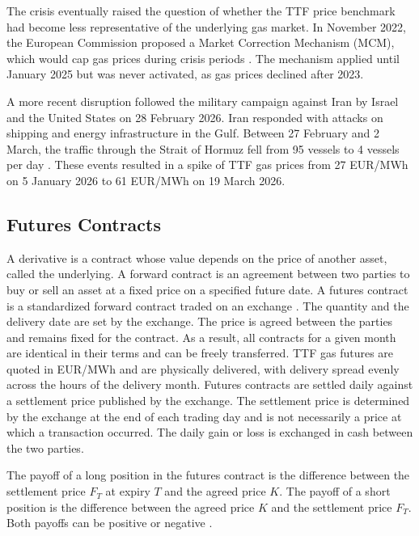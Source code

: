 The crisis eventually raised the question of whether the TTF price benchmark had become less representative of the underlying gas market. In November 2022, the European Commission proposed a Market Correction Mechanism (MCM), which would cap gas prices during crisis periods \parencite{MCM-euro-commision}. The mechanism applied until January 2025 but was never activated, as gas prices declined after 2023.

A more recent disruption followed the military campaign against Iran by Israel and the United States on 28 February 2026. Iran responded with attacks on shipping and energy infrastructure in the Gulf. Between 27 February and 2 March, the traffic through the Strait of Hormuz fell from 95 vessels to 4 vessels per day \parencite{persian-gulf-26}. These events resulted in a spike of TTF gas prices from 27 EUR/MWh on 5 January 2026 to 61 EUR/MWh on 19 March 2026.

\subsection{Futures Contracts}\label{sec:futures}
A derivative is a contract whose value depends on the price of another asset, called the underlying. A forward contract is an agreement between two parties to buy or sell an asset at a fixed price on a specified future date. A futures contract is a standardized forward contract traded on an exchange \parencite[28--30]{hullOptionsFuturesOther2022}.
The quantity and the delivery date are set by the exchange. The price is agreed between the parties and remains fixed for the contract. As a result, all contracts for a given month are identical in their terms and can be freely transferred. TTF gas futures are quoted in EUR/MWh and are physically delivered, with delivery spread evenly across the hours of the delivery month. Futures contracts are settled daily against a settlement price published by the exchange. The settlement price is determined by the exchange at the end of each trading day and is not necessarily a price at which a transaction occurred. The daily gain or loss is exchanged in cash between the two parties. 

The payoff of a long position in the futures contract is the difference between the settlement price $F_T$ at expiry $T$ and the agreed price $K$. The payoff of a short position is the difference between the agreed price $K$ and the settlement price $F_T$. Both payoffs can be positive or negative \parencite[29]{hullOptionsFuturesOther2022}.

